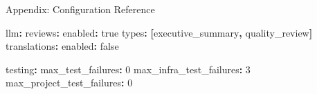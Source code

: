 \documentclass[
  ignorenonframetext,
]{beamer}
\newenvironment{Shaded}{}{}
\newcommand{\AttributeTok}[1]{\textcolor[rgb]{0.49,0.56,0.16}{#1}}
\newcommand{\CharTok}[1]{\textcolor[rgb]{0.25,0.44,0.63}{#1}}
\newcommand{\DecValTok}[1]{\textcolor[rgb]{0.25,0.63,0.44}{#1}}
\newcommand{\FunctionTok}[1]{\textcolor[rgb]{0.02,0.16,0.49}{#1}}
\newcommand{\KeywordTok}[1]{\textcolor[rgb]{0.00,0.44,0.13}{\textbf{#1}}}
\begin{document}
\begin{frame}[fragile]{Appendix: Configuration Reference}
\begin{Shaded}
\begin{Highlighting}[]
\FunctionTok{llm}\KeywordTok{:}
\AttributeTok{  }\FunctionTok{reviews}\KeywordTok{:}
\AttributeTok{    }\FunctionTok{enabled}\KeywordTok{:}\AttributeTok{ }\CharTok{true}
\AttributeTok{    }\FunctionTok{types}\KeywordTok{:}\AttributeTok{ }\KeywordTok{[}\AttributeTok{executive\_summary}\KeywordTok{,}\AttributeTok{ quality\_review}\KeywordTok{]}
\AttributeTok{  }\FunctionTok{translations}\KeywordTok{:}
\AttributeTok{    }\FunctionTok{enabled}\KeywordTok{:}\AttributeTok{ }\CharTok{false}

\FunctionTok{testing}\KeywordTok{:}
\AttributeTok{  }\FunctionTok{max\_test\_failures}\KeywordTok{:}\AttributeTok{ }\DecValTok{0}
\AttributeTok{  }\FunctionTok{max\_infra\_test\_failures}\KeywordTok{:}\AttributeTok{ }\DecValTok{3}
\AttributeTok{  }\FunctionTok{max\_project\_test\_failures}\KeywordTok{:}\AttributeTok{ }\DecValTok{0}
\end{Highlighting}
\end{Shaded}
\end{frame}
\end{document}
